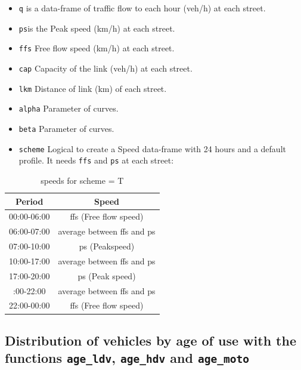 \documentclass[12pt,graybox,envcountchap,sectrefs]{krantz}
\providecommand{\tightlist}{%
  \setlength{\itemsep}{0pt}\setlength{\parskip}{0pt}}
\theoremstyle{definition}
\theoremstyle{definition}
\theoremstyle{definition}
\theoremstyle{remark}
\begin{document}
\begin{itemize}
\tightlist
\item
  \texttt{q} is a data-frame of traffic flow to each hour (veh/h) at
  each street.
\item
  \texttt{ps}is the Peak speed (km/h) at each street.
\item
  \texttt{ffs} Free flow speed (km/h) at each street.
\item
  \texttt{cap} Capacity of the link (veh/h) at each street.
\item
  \texttt{lkm} Distance of link (km) of each street.
\item
  \texttt{alpha} Parameter of \citet{bpr} curves.
\item
  \texttt{beta} Parameter of \citet{bpr} curves.
\item
  \texttt{scheme} Logical to create a Speed data-frame with 24 hours and
  a default profile. It needs \texttt{ffs} and \texttt{ps} at each
  street:
\end{itemize}

\begin{table}

\caption{\label{tab:unnamed-chunk-40}speeds for scheme = T}
\centering
\begin{tabular}[t]{cc}
\toprule
Period & Speed\\
\midrule
00:00-06:00 & ffs (Free flow speed)\\
06:00-07:00 & average between ffs and ps\\
07:00-10:00 & ps (Peakspeed)\\
10:00-17:00 & average between ffs and ps\\
17:00-20:00 & ps (Peak speed)\\
\addlinespace
20:00-22:00 & average between ffs and ps\\
22:00-00:00 & ffs (Free flow speed)\\
\bottomrule
\end{tabular}
\end{table}

\subsection{\texorpdfstring{Distribution of vehicles by age of use with
the functions \texttt{age\_ldv}, \texttt{age\_hdv} and
\texttt{age\_moto}}{Distribution of vehicles by age of use with the functions age\_ldv, age\_hdv and age\_moto}}\label{distribution-of-vehicles-by-age-of-use-with-the-functions-age_ldv-age_hdv-and-age_moto}
\end{document}
